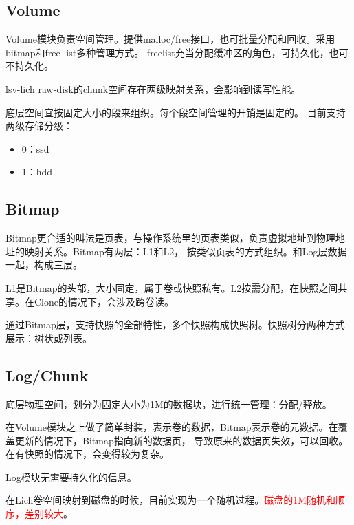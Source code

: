 \documentclass[UTF8]{ctexart}
\begin{document}
\subsection{Volume}

Volume模块负责空间管理。提供malloc/free接口，也可批量分配和回收。采用bitmap和free list多种管理方式。
freelist充当分配缓冲区的角色，可持久化，也可不持久化。

lsv-lich raw-disk的chunk空间存在两级映射关系，会影响到读写性能。

底层空间宜按固定大小的段来组织。每个段空间管理的开销是固定的。
目前支持两级存储分级：
\begin{tcolorbox}
    \begin{multicols}{2}
        \begin{itemize}
            \item 0：ssd
            \item 1：hdd
        \end{itemize}
    \end{multicols}
\end{tcolorbox}

\subsection{Bitmap}

Bitmap更合适的叫法是页表，与操作系统里的页表类似，负责虚拟地址到物理地址的映射关系。Bitmap有两层：L1和L2，
按类似页表的方式组织。和Log层数据一起，构成三层。

L1是Bitmap的头部，大小固定，属于卷或快照私有。L2按需分配，在快照之间共享。在Clone的情况下，会涉及跨卷读。

通过Bitmap层，支持快照的全部特性，多个快照构成快照树。快照树分两种方式展示：树状或列表。

\subsection{Log/Chunk}

底层物理空间，划分为固定大小为1M的数据块，进行统一管理：分配/释放。

在Volume模块之上做了简单封装，表示卷的数据，Bitmap表示卷的元数据。在覆盖更新的情况下，Bitmap指向新的数据页，
导致原来的数据页失效，可以回收。在有快照的情况下，会变得较为复杂。

Log模块无需要持久化的信息。

在Lich卷空间映射到磁盘的时候，目前实现为一个随机过程。\textcolor{red}{磁盘的1M随机和顺序，差别较大}。
\end{document}

